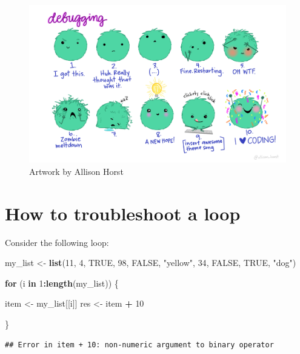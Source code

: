 \documentclass[
]{book}
\newenvironment{Shaded}{\begin{snugshade}}{\end{snugshade}}
\newcommand{\ConstantTok}[1]{\textcolor[rgb]{0.56,0.35,0.01}{#1}}
\newcommand{\ControlFlowTok}[1]{\textcolor[rgb]{0.13,0.29,0.53}{\textbf{#1}}}
\newcommand{\DecValTok}[1]{\textcolor[rgb]{0.00,0.00,0.81}{#1}}
\newcommand{\FunctionTok}[1]{\textcolor[rgb]{0.13,0.29,0.53}{\textbf{#1}}}
\newcommand{\NormalTok}[1]{#1}
\newcommand{\OtherTok}[1]{\textcolor[rgb]{0.56,0.35,0.01}{#1}}
\newcommand{\SpecialCharTok}[1]{\textcolor[rgb]{0.81,0.36,0.00}{\textbf{#1}}}
\newcommand{\StringTok}[1]{\textcolor[rgb]{0.31,0.60,0.02}{#1}}
\begin{document}
\begin{figure}

{\centering \includegraphics[width=0.8\linewidth]{img/debugging} 

}

\caption{Artwork by Allison Horst}\label{fig:debugging}
\end{figure}

\hypertarget{how-to-troubleshoot-a-loop}{%
\section{How to troubleshoot a loop}\label{how-to-troubleshoot-a-loop}}

Consider the following loop:

\begin{Shaded}
\begin{Highlighting}[]
\NormalTok{my\_list }\OtherTok{\textless{}{-}} \FunctionTok{list}\NormalTok{(}\DecValTok{11}\NormalTok{, }\DecValTok{4}\NormalTok{, }\ConstantTok{TRUE}\NormalTok{, }\DecValTok{98}\NormalTok{, }\ConstantTok{FALSE}\NormalTok{, }\StringTok{"yellow"}\NormalTok{, }\DecValTok{34}\NormalTok{, }\ConstantTok{FALSE}\NormalTok{, }\ConstantTok{TRUE}\NormalTok{, }\StringTok{"dog"}\NormalTok{)}

\ControlFlowTok{for}\NormalTok{ (i }\ControlFlowTok{in} \DecValTok{1}\SpecialCharTok{:}\FunctionTok{length}\NormalTok{(my\_list)) \{}
  
\NormalTok{  item }\OtherTok{\textless{}{-}}\NormalTok{ my\_list[[i]]}
\NormalTok{  res }\OtherTok{\textless{}{-}}\NormalTok{ item }\SpecialCharTok{+} \DecValTok{10}

\NormalTok{\}}
\end{Highlighting}
\end{Shaded}

\begin{verbatim}
## Error in item + 10: non-numeric argument to binary operator
\end{verbatim}
\end{document}
